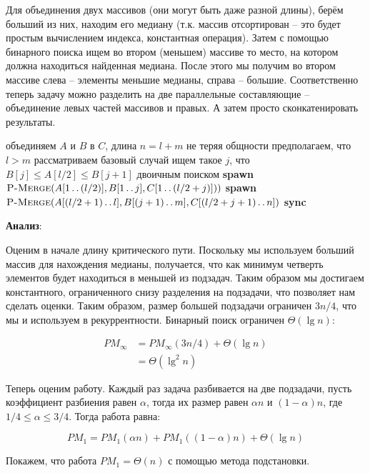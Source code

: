 \documentclass[a4paper,11pt]{article}
\begin{document}
Для объединения двух массивов (они могут быть даже разной длины), берём больший
из них, находим его медиану (т.к. массив отсортирован -- это будет простым
вычислением индекса, константная операция). Затем с помощью бинарного поиска
ищем во втором (меньшем) массиве то место, на котором должна находиться
найденная медиана. После этого мы получим во втором массиве слева -- элементы
меньшие медианы, справа -- большие. Соответственно теперь задачу можно разделить
на две параллельные составляющие -- объединение левых частей массивов и правых.
А затем просто сконкатенировать результаты.

\begin{codebox}
\li \Comment объединяем $A$ и $B$ в $C$, длина $n = l + m$
\li \Comment не теряя общности предполагаем, что $l > m$
\li рассматриваем базовый случай 
\li ищем такое $j$, что $B[j] \leqslant A[l/2] \leqslant B[j+1]$ двоичным поиском
\li \textbf{spawn} $\textnormal{\scshape P-Merge}(A[1 \mathinner{\ldotp\ldotp} (l/2)], B[1 \mathinner{\ldotp\ldotp} j], C[1
  \mathinner{\ldotp\ldotp} (l/2 + j)]))$
\li \textbf{spawn} $\textnormal{\scshape P-Merge}(A[(l/2+1) \mathinner{\ldotp\ldotp} l], B[(j+1) \mathinner{\ldotp\ldotp} m], C[(l/2+j+1)
  \mathinner{\ldotp\ldotp} n])$
\li \textbf{sync}
\li \Return
\end{codebox}

\textbf{Анализ}:

Оценим в начале длину критического пути. Поскольку мы используем больший массив
для нахождения медианы, получается, что как минимум четверть элементов будет
находиться в меньшей из подзадач. Таким образом мы достигаем константного,
ограниченного снизу разделения на подзадачи, что позволяет нам сделать оценки.
Таким образом, размер большей подзадачи ограничен $3n/4$, что мы и используем в
рекуррентности. Бинарный поиск ограничен $\Theta(\lg n)$:

\begin{align*}
  PM_{\infty} &= PM_{\infty}(3n/4) + \Theta(\lg n) \\
    &= \Theta(\lg^2 n)
\end{align*}

Теперь оценим работу. Каждый раз задача разбивается на две подзадачи, пусть
коэффициент разбиения равен $\alpha$, тогда их размер равен $\alpha n$ и $(1 -
\alpha) n$, где $1/4 \leqslant \alpha \leqslant 3/4$. Тогда работа равна:

$$
PM_1 = PM_1(\alpha n) + PM_1((1 - \alpha)n) + \Theta(\lg n)
$$

Покажем, что работа $PM_1 = \Theta(n)$ с помощью метода подстановки.
\end{document}
